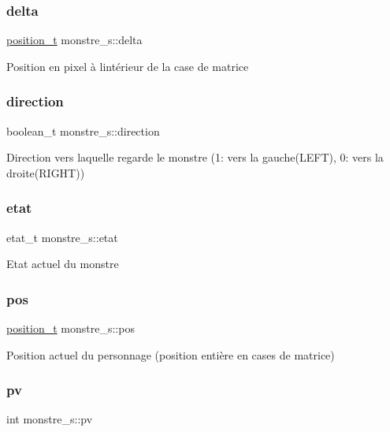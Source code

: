 \subsubsection{\texorpdfstring{delta}{delta}}
{\footnotesize\ttfamily \hyperlink{structposition__s}{position\+\_\+t} monstre\+\_\+s\+::delta}

Position en pixel à l\textquotesingle{}intérieur de la case de matrice \mbox{\label{structmonstre__s_aa1a2d6868b660addc5855614f1849540}} 
\subsubsection{\texorpdfstring{direction}{direction}}
{\footnotesize\ttfamily boolean\+\_\+t monstre\+\_\+s\+::direction}

Direction vers laquelle regarde le monstre (1\+: vers la gauche(\+L\+E\+F\+T), 0\+: vers la droite(\+R\+I\+G\+H\+T)) \mbox{\label{structmonstre__s_a38d270db8b7dd326f1e014eb3b72b740}} 
\subsubsection{\texorpdfstring{etat}{etat}}
{\footnotesize\ttfamily etat\+\_\+t monstre\+\_\+s\+::etat}

Etat actuel du monstre \mbox{\label{structmonstre__s_a972c2fb3087127d04bd3719d62c1030e}} 
\subsubsection{\texorpdfstring{pos}{pos}}
{\footnotesize\ttfamily \hyperlink{structposition__s}{position\+\_\+t} monstre\+\_\+s\+::pos}

Position actuel du personnage (position entière en cases de matrice) \mbox{\label{structmonstre__s_a1e26c0e85b90352f9496f331ec74e98d}} 
\subsubsection{\texorpdfstring{pv}{pv}}
{\footnotesize\ttfamily int monstre\+\_\+s\+::pv}

